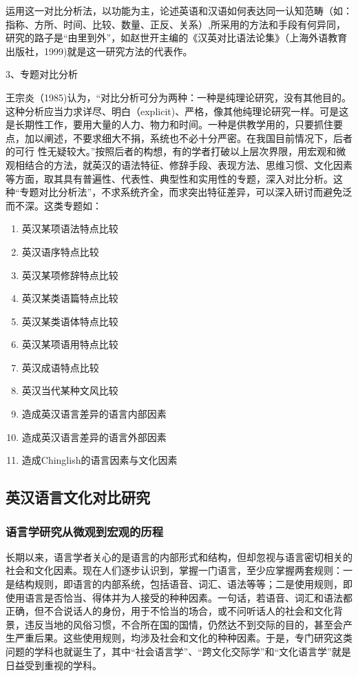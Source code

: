 运用这一对比分析法，以功能为主，论述英语和汉语如何表达同一认知范畴（如：指称、方所、时间、比较、数量、正反、关系）,所采用的方法和手段有何异同，研究的路子是“由里到外”，如赵世开主编的《汉英对比语法论集》（上海外语教育出版社，1999)就是这一研究方法的代表作。

3、专题对比分析

王宗炎（1985)认为，“对比分析可分为两种：一种是纯理论研究，没有其他目的。这种分析应当力求详尽、明白（explicit)、严格，像其他纯理论研究一样。可是这是长期性工作，要用大量的人力、物力和时间。一种是供教学用的，只要抓住要点，加以阐述，不要求细大不捐，系统也不必十分严密。在我国目前情况下，后者的可行
性无疑较大。”按照后者的构想，有的学者打破以上层次界限，用宏观和微观相结合的方法，就英汉的语法特征、修辞手段、表现方法、思维习惯、文化因素等方面，取其具有普遍性、代表性、典型性和实用性的专题，深入对比分析。这种“专题对比分析法”，不求系统齐全，而求突出特征差异，可以深入研讨而避免泛而不深。这类专题如：
\begin{enumerate}[label=\circled{\arabic*}]
    \item 英汉某项语法特点比较
    \item 英汉语序特点比较
    \item 英汉某项修辞特点比较
    \item 英汉某类语篇特点比较
    \item 英汉某类语体特点比较
    \item 英汉某项语用特点比较
    \item 英汉成语特点比较
    \item 英汉当代某种文风比较
    \item 造成英汉语言差异的语言内部因素
    \item 造成英汉语言差异的语言外部因素
    \item 造成Chinglish的语言因素与文化因素
\end{enumerate}

\subsection{英汉语言文化对比研究}

\subsubsection{语言学研究从微观到宏观的历程}

长期以来，语言学者关心的是语言的内部形式和结构，但却忽视与语言密切相关的社会和文化因素。现在人们逐步认识到，掌握一门语言，至少应掌握两套规则：一是结构规则，即语言的内部系统，包括语音、词汇、语法等等；二是使用规则，即使用语言是否恰当、得体并为人接受的种种因素。一句话，若语音、词汇和语法都正确，但不合说话人的身份，用于不恰当的场合，或不问听话人的社会和文化背景，违反当地的风俗习惯，不合所在国的国情，仍然达不到交际的目的，甚至会产生严重后果。这些使用规则，均涉及社会和文化的种种因素。于是，专门研究这类问题的学科也就诞生了，其中“社会语言学”、“跨文化交际学”和“文化语言学”就是日益受到重视的学科。

